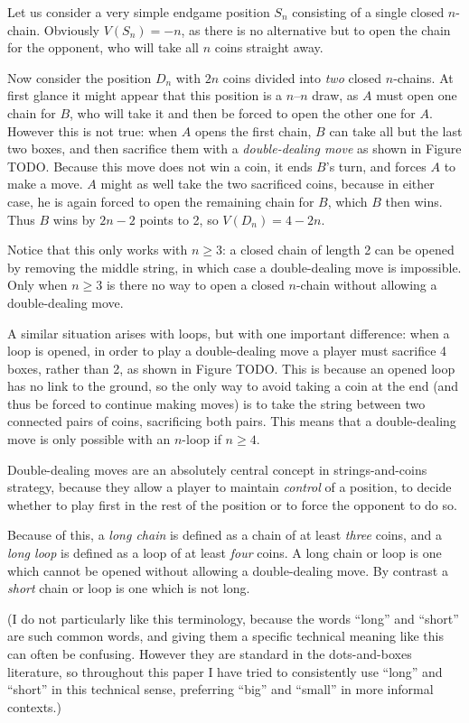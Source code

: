 \documentclass[a4paper,twocolumn]{article}
\begin{document}
Let us consider a very simple endgame position $S_n$ consisting of a
single closed $n$-chain. Obviously $V(S_n)=-n$, as there is no
alternative but to open the chain for the opponent, who will take all
$n$ coins straight away.

Now consider the position $D_n$ with $2n$ coins divided into
\emph{two} closed $n$-chains. At first glance it might appear that
this position is a $n$--$n$ draw, as $A$ must open one chain for $B$,
who will take it and then be forced to open the other one for
$A$. However this is not true: when $A$ opens the first chain, $B$ can
take all but the last two boxes, and then sacrifice them with a
\emph{double-dealing move} as shown in Figure TODO. Because this move
does not win a coin, it ends $B$'s turn, and forces $A$ to make a
move. $A$ might as well take the two sacrificed coins, because in
either case, he is again forced to open the remaining chain for $B$,
which $B$ then wins. Thus $B$ wins by $2n - 2$ points to 2, so $V(D_n)
= 4-2n$.

Notice that this only works with $n \ge 3$: a closed chain of length 2
can be opened by removing the middle string, in which case a
double-dealing move is impossible. Only when $n \ge 3$ is there no way
to open a closed $n$-chain without allowing a double-dealing move.

A similar situation arises with loops, but with one important
difference: when a loop is opened, in order to play a double-dealing
move a player must sacrifice 4 boxes, rather than 2, as shown in
Figure TODO. This is because an opened loop has no link to the ground,
so the only way to avoid taking a coin at the end (and thus be forced
to continue making moves) is to take the string between two connected
pairs of coins, sacrificing both pairs. This means that a
double-dealing move is only possible with an $n$-loop if $n \ge 4$.

Double-dealing moves are an absolutely central concept in
strings-and-coins strategy, because they allow a player to maintain
\emph{control} of a position, to decide whether to play first in the
rest of the position or to force the opponent to do so.

Because of this, a \emph{long chain} is defined as a chain of at least
\emph{three} coins, and a \emph{long loop} is defined as a loop of at
least \emph{four} coins. A long chain or loop is one which cannot be
opened without allowing a double-dealing move. By contrast a
\emph{short} chain or loop is one which is not long.

(I do not particularly like this terminology, because the words
``long'' and ``short'' are such common words, and giving them a
specific technical meaning like this can often be confusing. However
they are standard in the dots-and-boxes literature, so throughout this
paper I have tried to consistently use ``long'' and ``short'' in this
technical sense, preferring ``big'' and ``small'' in more informal
contexts.)
\end{document}
